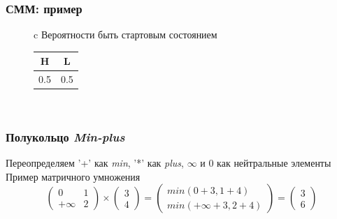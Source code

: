 \documentclass{beamer}
\begin{document}
\begin{frame}[fragile]
	\frametitle{СММ: пример}
	\centering
\begin{figure}
	\label{fig:HMM}
\end{figure}
\begin{figure}
	\begin{tabular}{c}
		Вероятности быть стартовым состоянием\\
		\begin{tabular}{|c|c|}
			\hline
			H & L \\
			\hline
			0.5 & 0.5 \\
			\hline
		\end{tabular} \\
	\end{tabular}
\end{figure}
\end{frame}

\begin{frame}[fragile]
	\frametitle{Полукольцо \emph{Min-plus}}
Переопределяем '+' как \emph{min}, '*' как  \emph{plus}, $\infty$ и $0$ как нейтральные элементы
	\vfill
	Пример матричного умножения
\[
  \begin{pmatrix}
    0 & 1 \\
    +\infty & 2
  \end{pmatrix}
  \times
  \begin{pmatrix}
    3 \\
    4
  \end{pmatrix}
  =
  \begin{pmatrix}
    min(0 + 3, 1 + 4) \\
    min(+\infty + 3, 2 + 4)
  \end{pmatrix}
  =
  \begin{pmatrix}
    3 \\
    6
  \end{pmatrix}
\]
\end{frame}
\end{document}
